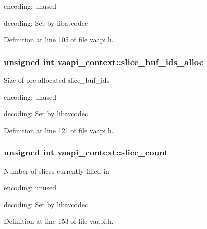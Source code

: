 \begin{DoxyItemize}
\item encoding\+: unused
\item decoding\+: Set by libavcodec 
\end{DoxyItemize}

Definition at line 105 of file vaapi.\+h.

\subsubsection[{\texorpdfstring{slice\+\_\+buf\+\_\+ids\+\_\+alloc}{slice_buf_ids_alloc}}]{\setlength{\rightskip}{0pt plus 5cm}unsigned {\bf int} vaapi\+\_\+context\+::slice\+\_\+buf\+\_\+ids\+\_\+alloc}\hypertarget{structvaapi__context_a4eb08e120d10e1ca3f0692cf9eba826a}{}\label{structvaapi__context_a4eb08e120d10e1ca3f0692cf9eba826a}
Size of pre-\/allocated slice\+\_\+buf\+\_\+ids


\begin{DoxyItemize}
\item encoding\+: unused
\item decoding\+: Set by libavcodec 
\end{DoxyItemize}

Definition at line 121 of file vaapi.\+h.

\subsubsection[{\texorpdfstring{slice\+\_\+count}{slice_count}}]{\setlength{\rightskip}{0pt plus 5cm}unsigned {\bf int} vaapi\+\_\+context\+::slice\+\_\+count}\hypertarget{structvaapi__context_ab4dc6ff8af4a58cf53520f7b6435e6dd}{}\label{structvaapi__context_ab4dc6ff8af4a58cf53520f7b6435e6dd}
Number of slices currently filled in


\begin{DoxyItemize}
\item encoding\+: unused
\item decoding\+: Set by libavcodec 
\end{DoxyItemize}

Definition at line 153 of file vaapi.\+h.

